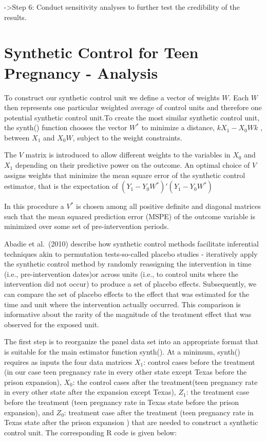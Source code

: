 \documentclass[
]{article}
\begin{document}
-\textgreater Step 6: Conduct sensitivity analyses to further test the
credibility of the results.

\newpage

\hypertarget{synthetic-control-for-teen-pregnancy---analysis}{%
\section{\texorpdfstring{\textbf{Synthetic Control for Teen Pregnancy -
Analysis}}{Synthetic Control for Teen Pregnancy - Analysis}}\label{synthetic-control-for-teen-pregnancy---analysis}}

To construct our synthetic control unit we define a vector of weights
\(W\). Each \(W\) then represents one particular weighted average of
control units and therefore one potential synthetic control unit.To
create the most similar synthetic control unit, the synth() function
chooses the vector \(W^*\) to minimize a distance, \(kX_{1} − X_{0}Wk\)
, between \(X_{1}\) and \(X_{0}W\), subject to the weight constraints.

The \(V\) matrix is introduced to allow different weights to the
variables in \(X_{0}\) and \(X_{1}\) depending on their predictive power
on the outcome. An optimal choice of \(V\) assigns weights that minimize
the mean square error of the synthetic control estimator, that is the
expectation of \((Y_{1} − Y_{0}W^*)'(Y_{1} − Y_{0}W^*)\)

In this procedure a \(V^*\) is chosen among all positive definite and
diagonal matrices such that the mean squared prediction error (MSPE) of
the outcome variable is minimized over some set of pre-intervention
periods.

Abadie et al.~(2010) describe how synthetic control methods facilitate
inferential techniques akin to permutation tests-so-called placebo
studies - iteratively apply the synthetic control method by randomly
reassigning the intervention in time (i.e., pre-intervention dates)or
across units (i.e., to control units where the intervention did not
occur) to produce a set of placebo effects. Subsequently, we can compare
the set of placebo effects to the effect that was estimated for the time
and unit where the intervention actually occurred. This comparison is
informative about the rarity of the magnitude of the treatment effect
that was observed for the exposed unit.

The first step is to reorganize the panel data set into an appropriate
format that is suitable for the main estimator function synth(). At a
minimum, synth() requires as inputs the four data matrices \(X_{1}\):
control cases before the treatment (in our case teen pregnancy rate in
every other state except Texas before the prison expansion), \(X_{0}\):
the control cases after the treatment(teen pregnancy rate in every other
state after the expansion except Texas), \(Z_{1}\): the treatment case
before the treatment (teen pregnancy rate in Texas state before the
prison expansion), and \(Z_{0}\): treatment case after the treatment
(teen pregnancy rate in Texas state after the prison expansion ) that
are needed to construct a synthetic control unit. The corresponding R
code is given below:
\end{document}
